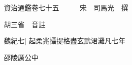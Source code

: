 






























































資治通鑑卷七十五　　　宋　司馬光　撰

胡三省　音註

魏紀七|{
	起柔兆攝提格盡玄黓涒灘凡七年}


邵陵厲公中


